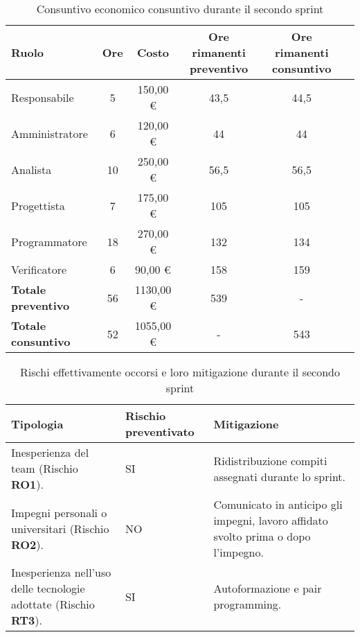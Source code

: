 \begin{table}[!h]
    \centering
    \begin{tabular}{ | l | c | c | c | c | c | }
        \hline
        \textbf{Ruolo} & \textbf{Ore} & \textbf{Costo} & \textbf{Ore rimanenti preventivo} & \textbf{Ore rimanenti consuntivo} \\
        \hline
        Responsabile               &  5   &  150,00 € &  43,5 &  44,5 \\
        Amministratore             &  6   &  120,00 € &  44   &  44   \\
        Analista                   & 10   &  250,00 € &  56,5 &  56,5 \\
        Progettista                &  7   &  175,00 € & 105   & 105   \\
        Programmatore              & 18   &  270,00 € & 132   & 134   \\
        Verificatore               &  6   &   90,00 € & 158   & 159   \\
        \hline
        \textbf{Totale preventivo} & 56   & 1130,00 € & 539   &   -   \\
        \hline
        \textbf{Totale consuntivo} & 52   & 1055,00 € &   -   & 543   \\
        \hline
    \end{tabular}
    \caption{Consuntivo economico consuntivo durante il secondo sprint}
    \label{tab:19}
\end{table}

\begin{table}[!h]
    \centering
    \begin{tabular}{ | p{6cm} | p{2.5cm} | p{7.5cm} | }
        \hline
        \textbf{Tipologia} & \textbf{Rischio preventivato} & \textbf{Mitigazione}  \\
        \hline
        Inesperienza del team (Rischio \textbf{RO1}). & SI & Ridistribuzione compiti assegnati durante lo sprint.\\
        \hline
        Impegni personali o universitari (Rischio \textbf{RO2}). & NO & Comunicato in anticipo gli impegni, lavoro affidato svolto prima o dopo l'impegno.\\
        \hline
        Inesperienza nell'uso delle tecnologie adottate (Rischio \textbf{RT3}). & SI & Autoformazione e pair programming.\\
        \hline
    \end{tabular}
    \caption{Rischi effettivamente occorsi e loro mitigazione durante il secondo sprint}
    \label{tab:20}
\end{table}

